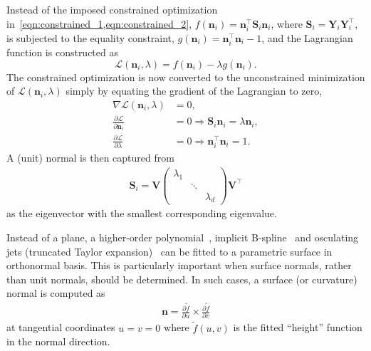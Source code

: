 Instead of the imposed constrained optimization in~\cref{eqn:constrained_1,eqn:constrained_2}, $f(\mathbf{n}_i) = \mathbf{n}_i^\intercal \mathbf{S}_i \mathbf{n}_i$, where $\mathbf{S}_i = \mathbf{Y}_i \mathbf{Y}_i^\intercal$, is subjected to the equality constraint, $g(\mathbf{n}_i) = \mathbf{n}_i^\intercal \mathbf{n}_i - 1$, and the Lagrangian function is constructed as
\begin{equation*}
    \mathcal{L}(\mathbf{n}_i, \lambda) = f(\mathbf{n}_i) - \lambda g(\mathbf{n}_i).
\end{equation*}
The constrained optimization is now converted to the unconstrained minimization of $\mathcal{L}(\mathbf{n}_i, \lambda)$ simply by equating the gradient of the Lagrangian to zero,
\begin{align}
    \nabla \mathcal{L}(\mathbf{n}_i, \lambda) &= 0, \\
    \frac{\partial \mathcal{L}}{\partial \mathbf{n}_i} &= 0 \Rightarrow \mathbf{S}_i \mathbf{n}_i = \lambda \mathbf{n}_i, \\
    \frac{\partial \mathcal{L}}{\partial \lambda} &= 0 \Rightarrow \mathbf{n}_i^\intercal \mathbf{n}_i = 1.
\end{align}
A (unit) normal is then captured from
\begin{align}
    \mathbf{S}_i = \mathbf{V} \begin{pmatrix}
    \lambda_1 &  &  \\
    & \ddots & \\
    & & \lambda_d
    \end{pmatrix} \boldsymbol{V}^\intercal
\end{align}
as the eigenvector with the smallest corresponding eigenvalue.

Instead of a plane, a higher-order polynomial~\cite{Levin1998approximation}, implicit B-spline~\cite{Rouhani2015Implicit} and osculating jets (truncated Taylor expansion)~\cite{Cazals2005Estimating} can be fitted to a parametric surface in orthonormal basis.   
This is particularly important when surface normals, rather than unit normals, should be determined.
In such cases, a surface (or curvature) normal is computed as
\begin{align}
    \mathbf{n} = \frac{\partial \tilde f}{\partial u} \times \frac{\partial \tilde f}{\partial v}
\end{align}
at tangential coordinates $u = v = 0$ where $\tilde{f}(u, v)$ is the fitted ``height'' function in the normal direction.

